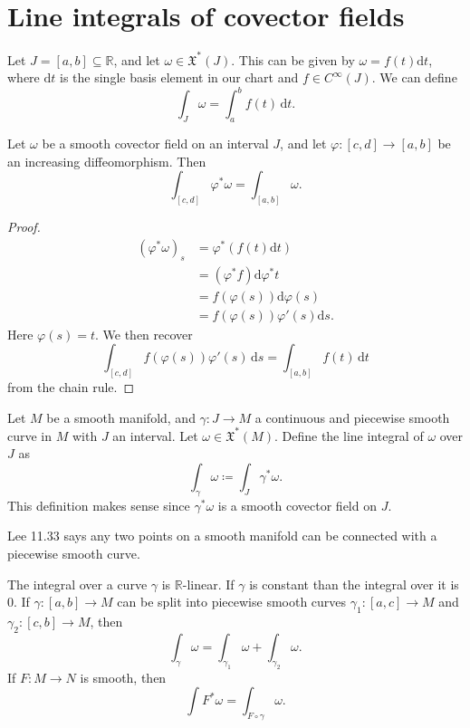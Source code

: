 \section{Line integrals of covector fields}

Let $J=[a,b]\subseteq \mathbb{R} $, and let $\omega \in \mathfrak{X} ^*(J)$. This can be given by $\omega =f(t) \mathrm{d} t$, where $\mathrm{d} t$ is the single basis element in our chart and $f\in C^\infty (J)$. We can define
\[
	\int_J \omega = \int_a^b f(t) \,\mathrm{d} t
.\]
\begin{proposition}\label{3.1.1}
	Let $\omega $ be a smooth covector field on an interval $J$, and let $\varphi : [c,d]\to [a,b]$ be an increasing diffeomorphism. Then
	\[
		\int_{[c,d]} \varphi^*\omega =\int_{[a,b]} \omega 
	.\]
\end{proposition}
\begin{proof}
	\begin{align*}
		(\varphi^*\omega )_s &= \varphi ^*(f(t)\mathrm{d} t)\\
				     &=(\varphi ^*f)\mathrm{d} \varphi ^*t\\
				     &=f(\varphi (s))\mathrm{d} \varphi (s)\\
				     &=f(\varphi (s))\varphi '(s)\mathrm{d} s
	.\end{align*}
	Here $\varphi (s)=t$. We then recover
	\[
		\int_{[c,d]} f(\varphi (s))\varphi '(s) \,\mathrm{d} s = \int_{[a,b]} f(t) \,\mathrm{d} t
	\]
	from the chain rule.
\end{proof}
\begin{definition}\label{3.1.2}
	Let $M$ be a smooth manifold, and $\gamma : J \to M$ a continuous and piecewise smooth curve in $M$ with $J$ an interval. Let $\omega \in \mathfrak{X} ^*(M)$. Define the line integral of $\omega $ over $J$ as
	\[
		\int_\gamma \omega \coloneqq \int_{J} \gamma ^*\omega
	.\]
	This definition makes sense since $\gamma ^*\omega $ is a smooth covector field on $J$.
\end{definition}

Lee 11.33 says any two points on a smooth manifold can be connected with a piecewise smooth curve.

\begin{proposition}\label{3.1.3}
	The integral over a curve $\gamma $ is $\mathbb{R} $-linear. If $\gamma $ is constant than the integral over it is 0. If $\gamma : [a,b] \to M$ can be split into piecewise smooth curves $\gamma _1 : [a,c] \to M$ and $\gamma _2: [c,b] \to M$, then
	\[
		\int_\gamma  \omega =\int_{\gamma _1} \omega +\int _{\gamma _2} \omega
	.\]
	If $F : M \to N$ is smooth, then
	\[
		\int F^*\omega =\int_{F\circ \gamma } \omega
	.\]
\end{proposition}

